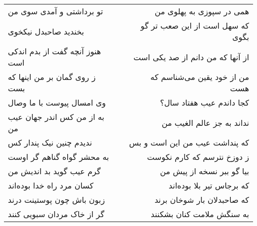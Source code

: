 \begin{center}
\begin{longtable}{l p{0.5cm} r}
تو برداشتی و آمدی سوی من
&&
همی در سپوزی به پهلوی من
\\
بخندید صاحبدل نیکخوی
&&
که سهل است از این صعب تر گو بگوی
\\
هنوز آنچه گفت از بدم اندکی است
&&
از آنها که من دانم از صد یکی است
\\
ز روی گمان بر من اینها که بست
&&
من از خود یقین می‌شناسم که هست
\\
وی امسال پیوست با ما وصال
&&
کجا داندم عیب هفتاد سال؟
\\
به از من کس اندر جهان عیب من
&&
نداند به جز عالم الغیب من
\\
ندیدم چنین نیک پندار کس
&&
که پنداشت عیب من این است و بس
\\
به محشر گواه گناهم گر اوست
&&
ز دوزخ نترسم که کارم نکوست
\\
گرم عیب گوید بد اندیش من
&&
بیا گو ببر نسخه از پیش من
\\
کسان مرد راه خدا بوده‌اند
&&
که برجاس تیر بلا بوده‌اند
\\
زبون باش چون پوستینت درند
&&
که صاحبدلان بار شوخان برند
\\
گر از خاک مردان سبویی کنند
&&
به سنگش ملامت کنان بشکنند
\\
\end{longtable}
\end{center}

